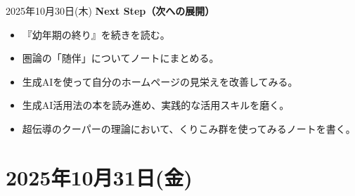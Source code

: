 \documentclass[dvipdfmx, autodetect-engine, aspectratio=169, 10.5pt]{beamer}
\begin{document}
\begin{frame}{2025年10月30日(木)}
	\textbf{Next Step（次への展開）}
	\begin{itemize}
		\item 『幼年期の終り』を続きを読む。
		\item 圏論の「随伴」についてノートにまとめる。
		\item 生成AIを使って自分のホームページの見栄えを改善してみる。
		\item 生成AI活用法の本を読み進め、実践的な活用スキルを磨く。
		\item 超伝導のクーパーの理論において、くりこみ群を使ってみるノートを書く。
	\end{itemize}
\end{frame}

\section{2025年10月31日(金)}  
\end{document}
